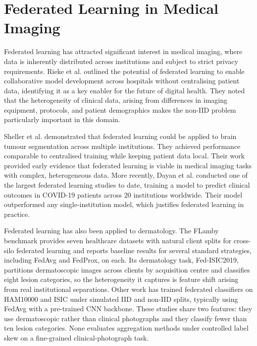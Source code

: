 \documentclass[12pt,openany,a4paper]{book}
\begin{document}
\section{Federated Learning in Medical Imaging}
Federated learning has attracted significant interest in medical imaging, where data is inherently distributed across institutions and subject to strict privacy requirements. Rieke et al. \cite{riekeFutureDigitalHealth2020} outlined the potential of federated learning to enable collaborative model development across hospitals without centralising patient data, identifying it as a key enabler for the future of digital health. They noted that the heterogeneity of clinical data, arising from differences in imaging equipment, protocols, and patient demographics makes the non-IID problem particularly important in this domain.

Sheller et al. \cite{shellerFederatedLearningMedicine2020} demonstrated that federated learning could be applied to brain tumour segmentation across multiple institutions. They achieved performance comparable to centralised training while keeping patient data local. Their work provided early evidence that federated learning is viable in medical imaging tasks with complex, heterogeneous data. More recently, Dayan et al. \cite{dayanFederatedLearningPredicting2021} conducted one of the largest federated learning studies to date, training a model to predict clinical outcomes in COVID-19 patients across 20 institutions worldwide. Their model outperformed any single-institution model, which justifies federated learning in practice.

Federated learning has also been applied to dermatology. The FLamby benchmark \cite{terrailFLambyDatasetsBenchmarks2023} provides seven healthcare datasets with natural client splits for cross-silo federated learning and reports baseline results for several standard strategies, including FedAvg and FedProx, on each. Its dermatology task, Fed-ISIC2019, partitions dermatoscopic images across clients by acquisition centre and classifies eight lesion categories, so the heterogeneity it captures is feature shift arising from real institutional separations. Other work has trained federated classifiers on HAM10000 and ISIC under simulated IID and non-IID splits, typically using FedAvg with a pre-trained CNN backbone. These studies share two features: they use dermatoscopic rather than clinical photographs and they classify fewer than ten lesion categories. None evaluates aggregation methods under controlled label skew on a fine-grained clinical-photograph task.
\end{document}
